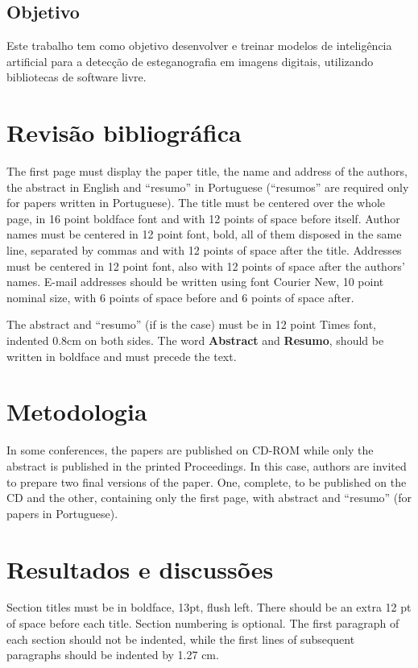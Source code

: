 \documentclass[12pt]{article}
\begin{document}
\subsection{Objetivo}

Este trabalho tem como objetivo desenvolver e treinar modelos de inteligência
artificial para a detecção de esteganografia em imagens digitais, utilizando
bibliotecas de software livre.

\section{Revisão bibliográfica} \label{sec:firstpage}

The first page must display the paper title, the name and address of the
authors, the abstract in English and ``resumo'' in Portuguese (``resumos'' are
required only for papers written in Portuguese). The title must be centered
over the whole page, in 16 point boldface font and with 12 points of space
before itself. Author names must be centered in 12 point font, bold, all of
them disposed in the same line, separated by commas and with 12 points of space
after the title. Addresses must be centered in 12 point font, also with 12
points of space after the authors' names. E-mail addresses should be written
using font Courier New, 10 point nominal size, with 6 points of space before
and 6 points of space after.

The abstract and ``resumo'' (if is the case) must be in 12 point Times font,
indented 0.8cm on both sides. The word \textbf{Abstract} and \textbf{Resumo},
should be written in boldface and must precede the text.

\section{Metodologia}

In some conferences, the papers are published on CD-ROM while only the abstract
is published in the printed Proceedings. In this case, authors are invited to
prepare two final versions of the paper. One, complete, to be published on the
CD and the other, containing only the first page, with abstract and ``resumo''
(for papers in Portuguese).

\section{Resultados e discussões}

Section titles must be in boldface, 13pt, flush left. There should be an extra
12 pt of space before each title. Section numbering is optional. The first
paragraph of each section should not be indented, while the first lines of
subsequent paragraphs should be indented by 1.27 cm.
\end{document}
